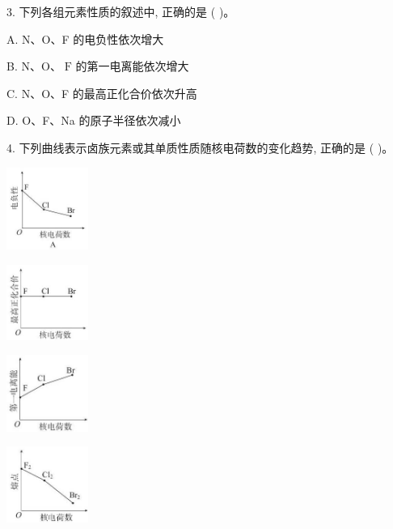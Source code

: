 \documentclass[10pt]{article}
\begin{document}
3. 下列各组元素性质的叙述中, 正确的是 ( )。

A. N、O、F 的电负性依次增大

B. \(\mathrm{N}\text{、}\mathrm{O}\text{、}\mathrm{\;F}\) 的第一电离能依次增大

C. N、O、F 的最高正化合价依次升高

D. O、F、Na 的原子半径依次减小

4. 下列曲线表示卤族元素或其单质性质随核电荷数的变化趋势, 正确的是 ( )。

\begin{center}
\includegraphics[max width=0.2\textwidth]{images/0190e026-5a11-7df7-bd27-54d09026ba7a_31_135171.jpg}
\end{center}

\begin{center}
\includegraphics[max width=0.2\textwidth]{images/0190e026-5a11-7df7-bd27-54d09026ba7a_31_771339.jpg}
\end{center}

\begin{center}
\includegraphics[max width=0.2\textwidth]{images/0190e026-5a11-7df7-bd27-54d09026ba7a_31_871216.jpg}
\end{center}

\begin{center}
\includegraphics[max width=0.2\textwidth]{images/0190e026-5a11-7df7-bd27-54d09026ba7a_31_860441.jpg}
\end{center}
\end{document}
